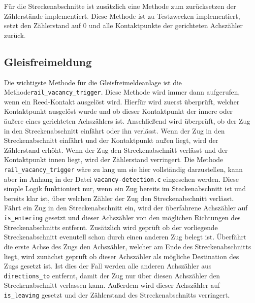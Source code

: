 Für die Streckenabschnitte ist zusätzlich eine Methode zum zurücksetzen der Zählerstände implementiert. Diese Methode ist zu Testzwecken implementiert, setzt den Zählerstand auf 0 und alle Kontaktpunkte der gerichteten Achszähler zurück.


\subsection{Gleisfreimeldung}\label{text:Entwicklung-der-GFA:Implementierung-der-Gleisfreimeldeanlage:Implementierung-der-Gleisfreimeldeanlage}
Die wichtigste Methode für die Gleisfreimeldeanlage ist die Methode\newline \texttt{rail\_vacancy\_trigger}. Diese Methode wird immer dann aufgerufen, wenn ein Reed-Kontakt ausgelöst wird. Hierfür wird zuerst überprüft, welcher Kontaktpunkt ausgelöst wurde und ob dieser Kontaktpunkt der innere oder äußere eines gerichteten Achszählers ist. Anschließend wird überprüft, ob der Zug in den Streckenabschnitt einfährt oder ihn verlässt. Wenn der Zug in den Streckenabschnitt einfährt und der Kontaktpunkt außen liegt, wird der Zählerstand erhöht. Wenn der Zug den Streckenabschnitt verlässt und der Kontaktpunkt innen liegt, wird der Zählerstand verringert. Die Methode \texttt{rail\_vacancy\_trigger} wäre zu lang um sie hier vollständig darzustellen, kann aber im Anhang in der Datei \texttt{vacancy-detection.c} eingesehen werden.
\newline
Diese simple Logik funktioniert nur, wenn ein Zug bereits im Steckenabschnitt ist und bereits klar ist, über welchen Zähler der Zug den Streckenabschnitt verlässt. 
\newline
Fährt ein Zug in den Streckenabschnitt ein, wird der überfahrene Achszähler auf \texttt{is\_entering} gesetzt und dieser Achszähler von den möglichen Richtungen des Streckenabschnitts entfernt. Zusätzlich wird geprüft ob der vorliegende Streckenabschnitt evenutell schon durch einen anderen Zug belegt ist.
\newline
Überfährt die erste Achse des Zugs den Achszähler, welcher am Ende des Streckenabschnitts liegt, wird zunächst geprüft ob dieser Achszähler als mögliche Destination des Zugs gesetzt ist. Ist dies der Fall werden alle anderen Achszähler aus \texttt{directions\_to} entfernt, damit der Zug nur über diesen Achszähler den Streckenabschnitt verlassen kann. Außerdem wird dieser Achszähler auf \texttt{is\_leaving} gesetzt und der Zählerstand des Streckenabschnitts verringert. 